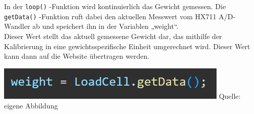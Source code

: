 \documentclass[ngerman,12pt,a4paper]{article}
\begin{document}
		\vspace{8pt}
		In der \texttt{loop()} -Funktion wird kontinuierlich das Gewicht gemessen. Die \texttt{getData()} -Funktion ruft dabei den aktuellen Messwert vom HX711 A/D-Wandler ab und speichert ihn in der Variablen „weight“. \\ [0.3cm]
		Dieser Wert stellt das aktuell gemessene Gewicht dar, das mithilfe der Kalibrierung in eine gewichtsspezifische Einheit umgerechnet wird. Dieser Wert kann dann auf die Website übertragen werden.
		\begin{center}
			\begin{minipage}{1\textwidth}
				\centering
				\includegraphics[width=\textwidth]{Pictures/code_hx711_messung}
				\label{fig:code_hx711_messung}
				\vspace{-3pt}
				{\small Quelle: {eigene Abbildung}}
			\end{minipage}
		\end{center}
		
\end{document}
